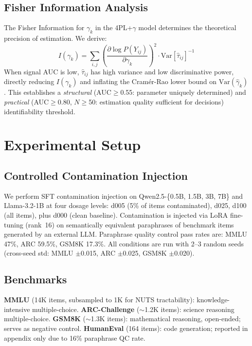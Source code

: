 \documentclass[11pt,a4paper]{article}
\begin{document}
\subsection{Fisher Information Analysis}

The Fisher Information for $\gamma_k$ in the 4PL+$\gamma$ model determines the theoretical precision of estimation.
We derive:
\begin{equation}
I(\gamma_k) = \sum_{i,j} \left(\frac{\partial \log P(Y_{ij})}{\partial \gamma_k}\right)^2 \cdot \text{Var}[\hat{\tau}_{ij}]^{-1}
\end{equation}
When signal AUC is low, $\hat{\tau}_{ij}$ has high variance and low discriminative power, directly reducing $I(\gamma_k)$ and inflating the Cram\'er-Rao lower bound on $\text{Var}(\hat{\gamma}_k)$.
This establishes a \emph{structural} (AUC$\geq$0.55: parameter uniquely determined) and \emph{practical} (AUC$\geq$0.80, $N\geq$50: estimation quality sufficient for decisions) identifiability threshold.

\section{Experimental Setup}
\label{sec:setup}

\subsection{Controlled Contamination Injection}

We perform SFT contamination injection on Qwen2.5-\{0.5B, 1.5B, 3B, 7B\} and Llama-3.2-1B at four dosage levels: d005 (5\% of items contaminated), d025, d100 (all items), plus d000 (clean baseline).
Contamination is injected via LoRA fine-tuning (rank~16) on semantically equivalent paraphrases of benchmark items generated by an external LLM.
Paraphrase quality control pass rates are: MMLU 47\%, ARC 59.5\%, GSM8K 17.3\%.
All conditions are run with 2--3 random seeds (cross-seed std: MMLU $\pm$0.015, ARC $\pm$0.025, GSM8K $\pm$0.020).

\subsection{Benchmarks}

\textbf{MMLU} (14K items, subsampled to 1K for NUTS tractability): knowledge-intensive multiple-choice.
\textbf{ARC-Challenge} ($\sim$1.2K items): science reasoning multiple-choice.
\textbf{GSM8K} ($\sim$1.3K items): mathematical reasoning, open-ended; serves as negative control.
\textbf{HumanEval} (164 items): code generation; reported in appendix only due to 16\% paraphrase QC rate.
\end{document}
